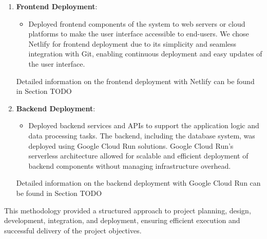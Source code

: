 \begin{enumerate}
    \item \textbf{Frontend Deployment}:
        \begin{itemize}
            \item Deployed frontend components of the system to web servers or cloud platforms to make the user interface accessible to end-users. We chose Netlify for frontend deployment due to its simplicity and seamless integration with Git, enabling continuous deployment and easy updates of the user interface.
        \end{itemize}
        Detailed information on the frontend deployment with Netlify can be found in Section TODO 

    \item \textbf{Backend Deployment}:
        \begin{itemize}
            \item Deployed backend services and APIs to support the application logic and data processing tasks. The backend, including the database system, was deployed using Google Cloud Run solutions. Google Cloud Run's serverless architecture allowed for scalable and efficient deployment of backend components without managing infrastructure overhead.
        \end{itemize}
        Detailed information on the backend deployment with Google Cloud Run can be found in Section TODO
\end{enumerate}

This methodology provided a structured approach to project planning, design, development, integration, and deployment, ensuring efficient execution and successful delivery of the project objectives.
